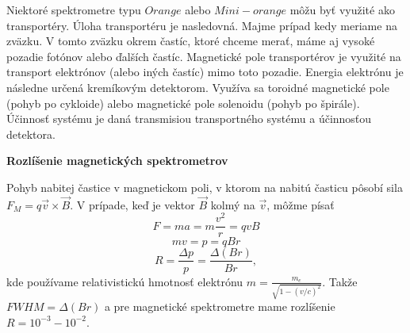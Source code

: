 \documentclass[../../main.tex]{subfiles}
\begin{document}
\begin{itemize}
Niektoré spektrometre typu $Orange$ alebo $Mini-orange$ môžu byť využité ako transportéry. Úloha transportéru je nasledovná. Majme prípad kedy meriame na zväzku. V tomto zväzku okrem častíc, ktoré chceme merať, máme aj vysoké pozadie fotónov alebo ďalších častíc. Magnetické pole transportérov je využité na transport elektrónov (alebo iných častíc) mimo toto pozadie. Energia elektrónu je následne určená kremíkovým detektorom. Využíva sa toroidné magnetické pole (pohyb po cykloide) alebo magnetické pole solenoidu (pohyb po špirále). Účinnosť systému je daná transmisiou transportného systému a účinnosťou detektora.
\end{itemize}

\textbf{Rozlíšenie magnetických spektrometrov}\par
Pohyb nabitej častice v magnetickom poli, v ktorom na nabitú časticu pôsobí sila $F_{M}=q\vec{v}\times \vec{B}$. V prípade, keď je vektor $\vec{B}$ kolmý na $\vec{v}$, môžme písať
$$ F=ma=m\frac{v^2}{r}=qvB $$ 
$$ mv=p=qBr $$
$$ R=\frac{\Delta p}{p}=\frac{\Delta(Br)}{Br},$$
kde používame relativistickú hmotnosť elektrónu $m=\frac{m_e}{\sqrt{1-(v/c)^2}}$. Takže $FWHM=\Delta(Br)$ a pre magnetické spektrometre mame rozlíšenie $R=10^{-3}-10^{-2}$.
\end{document}
